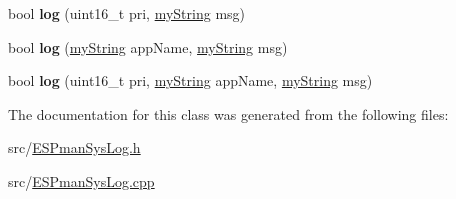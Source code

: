 \begin{DoxyCompactItemize}
bool {\bfseries log} (uint16\+\_\+t pri, \hyperlink{class_e_s_p_m_a_n_1_1my_string}{my\+String} msg)
\item 
\mbox{\label{class_sys_log_a1a6053509377113ecc7653d4298803a9}} 
bool {\bfseries log} (\hyperlink{class_e_s_p_m_a_n_1_1my_string}{my\+String} app\+Name, \hyperlink{class_e_s_p_m_a_n_1_1my_string}{my\+String} msg)
\item 
\mbox{\label{class_sys_log_a151d2992fdc2a6ea0a52996e34a4a21f}} 
bool {\bfseries log} (uint16\+\_\+t pri, \hyperlink{class_e_s_p_m_a_n_1_1my_string}{my\+String} app\+Name, \hyperlink{class_e_s_p_m_a_n_1_1my_string}{my\+String} msg)
\end{DoxyCompactItemize}


The documentation for this class was generated from the following files\+:\begin{DoxyCompactItemize}
\item 
src/\hyperlink{_e_s_pman_sys_log_8h}{E\+S\+Pman\+Sys\+Log.\+h}\item 
src/\hyperlink{_e_s_pman_sys_log_8cpp}{E\+S\+Pman\+Sys\+Log.\+cpp}\end{DoxyCompactItemize}
